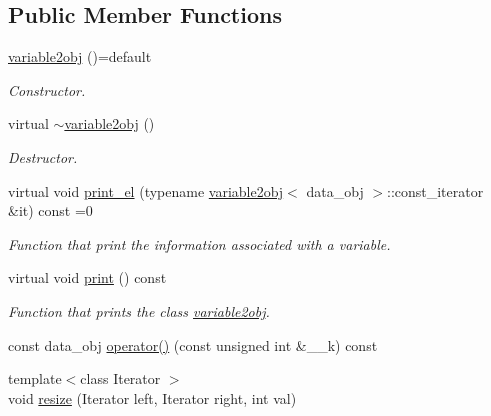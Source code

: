 \subsection*{Public Member Functions}
\begin{DoxyCompactItemize}
\item 
\hyperlink{structvariable2obj_afc52982e1eea6ceca5d6e41c8f2162c7}{variable2obj} ()=default
\begin{DoxyCompactList}\small\item\em Constructor. \end{DoxyCompactList}\item 
virtual \hyperlink{structvariable2obj_aa0f1e05028c5db51677151a9bf71ab87}{$\sim$variable2obj} ()
\begin{DoxyCompactList}\small\item\em Destructor. \end{DoxyCompactList}\item 
virtual void \hyperlink{structvariable2obj_a951c49f2d2a83790b32830b9f7fd1d30}{print\+\_\+el} (typename \hyperlink{structvariable2obj}{variable2obj}$<$ data\+\_\+obj $>$\+::const\+\_\+iterator \&it) const =0
\begin{DoxyCompactList}\small\item\em Function that print the information associated with a variable. \end{DoxyCompactList}\item 
virtual void \hyperlink{structvariable2obj_a3de17dd615a1c64089337a0461ff0075}{print} () const
\begin{DoxyCompactList}\small\item\em Function that prints the class \hyperlink{structvariable2obj}{variable2obj}. \end{DoxyCompactList}\item 
const data\+\_\+obj \hyperlink{structvariable2obj_a684730ba2c695c0d41d8a0b6405f4227}{operator()} (const unsigned int \&\+\_\+\+\_\+k) const
\item 
{\footnotesize template$<$class Iterator $>$ }\\void \hyperlink{structvariable2obj_a74c24f89e8a9a27dded758a415d90a96}{resize} (Iterator left, Iterator right, int val)
\end{DoxyCompactItemize}
